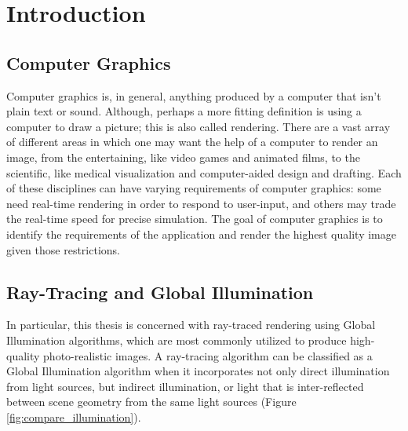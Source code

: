 \chapter{Introduction}

\section{Computer Graphics}
Computer graphics is, in general, anything produced by a computer that isn't plain text or sound. Although, perhaps a more fitting definition is using a computer to draw a picture; this is also called rendering. There are a vast array of different areas in which one may want the help of a computer to render an image, from the entertaining, like video games and animated films, to the scientific, like medical visualization and computer-aided design and drafting. Each of these disciplines can have varying requirements of computer graphics: some need real-time rendering in order to respond to user-input, and others may trade the real-time speed for precise simulation. The goal of computer graphics is to identify the requirements of the application and render the highest quality image given those restrictions.

\section{Ray-Tracing and Global Illumination}
In particular, this thesis is concerned with ray-traced rendering using Global Illumination algorithms, which are most commonly utilized to produce high-quality photo-realistic images. A ray-tracing algorithm can be classified as a Global Illumination algorithm when it incorporates not only direct illumination from light sources, but indirect illumination, or light that is inter-reflected between scene geometry from the same light sources (Figure \ref{fig:compare_illumination}).


